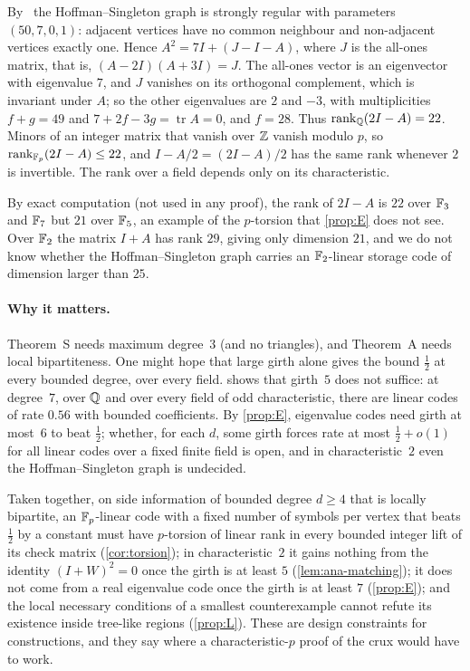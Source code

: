 \begin{informalproof}
By~\cite{HoffmanSingleton1960} the Hoffman--Singleton graph is strongly regular with parameters $(50,7,0,1)$:
adjacent vertices have no common neighbour and non-adjacent vertices exactly one. Hence $A^2=7I+(J-I-A)$, where $J$ is
the all-ones matrix, that is, $(A-2I)(A+3I)=J$. The all-ones vector is an eigenvector with eigenvalue $7$, and $J$
vanishes on its orthogonal complement, which is invariant under $A$; so the other eigenvalues are $2$ and $-3$, with
multiplicities $f+g=49$ and $7+2f-3g=\operatorname{tr}A=0$, and $f=28$. Thus
$\operatorname{rank}_{\mathbb{Q}}(2I-A)=22$. Minors of an integer matrix that vanish over $\mathbb{Z}$ vanish modulo $p$, so
$\operatorname{rank}_{\mathbb{F}_p}(2I-A)\le22$, and $I-A/2=(2I-A)/2$ has the same rank whenever $2$ is invertible. The rank over a field
depends only on its characteristic.
\end{informalproof}

\begin{remark}\label{rem:ana-hs}
By exact computation (not used in any proof), the rank of $2I-A$ is $22$ over $\mathbb{F}_3$ and $\mathbb{F}_7$ but $21$ over $\mathbb{F}_5$,
an example of the $p$-torsion that \cref{prop:E} does not see. Over $\mathbb{F}_2$ the matrix $I+A$ has rank $29$, giving only
dimension $21$, and we do not know whether the Hoffman--Singleton graph carries an $\mathbb{F}_2$-linear storage code of
dimension larger than $25$.
\end{remark}

\paragraph{Why it matters.} Theorem~S needs maximum degree~$3$ (and no triangles), and Theorem~A needs local
bipartiteness. One might hope
that large girth alone gives the bound $\frac12$ at every bounded degree, over every field.  shows that
girth~$5$ does not suffice: at degree~$7$, over $\mathbb{Q}$ and over every field of odd characteristic, there are linear codes
of rate $0.56$ with bounded coefficients. By \cref{prop:E}, eigenvalue codes need girth at most~$6$ to beat $\frac12$;
whether, for each $d$, some girth forces rate at most $\frac12+o(1)$ for all linear codes over a fixed finite field is
open, and in characteristic~$2$ even the Hoffman--Singleton graph is undecided.

Taken together, on side information of bounded degree $d\ge4$ that is locally bipartite, an $\mathbb{F}_p$-linear code with a
fixed number of symbols per vertex that beats $\frac12$ by a constant must have $p$-torsion of linear rank in every
bounded integer lift of its check matrix (\cref{cor:torsion}); in characteristic~$2$ it gains nothing from the identity
$(I+W)^2=0$ once the girth is at least $5$ (\cref{lem:ana-matching}); it does not come from a real eigenvalue code once
the girth is at least $7$ (\cref{prop:E}); and the local necessary conditions of a smallest counterexample cannot refute
its existence inside tree-like regions (\cref{prop:L}). These are design
constraints for constructions, and they say where a characteristic-$p$ proof of the crux would have to work.

